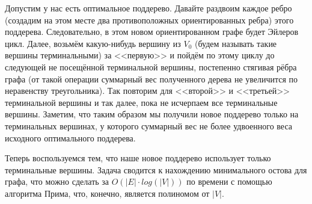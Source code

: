 \documentclass[a4paper,12pt]{article}
\begin{document}
    \vspace{1em}

    \noindent Допустим у нас есть оптимальное поддерево. Давайте раздвоим каждое ребро (создадим на этом месте два противоположных ориентированных ребра) этого поддерева. Следовательно, в этом новом ориентированном графе будет Эйлеров цикл. Далее, возьмём какую-нибудь вершину из $V_0$ (будем называть такие вершины терминальными) за <<первую>> и пойдём по этому циклу до следующей не посещённой терминальной вершины, постепенно стягивая рёбра графа (от такой операции суммарный вес полученного дерева не увеличится по неравенству треугольника). Так повторим для <<второй>> и <<третьей>> терминальной вершины и так далее, пока не исчерпаем все терминальные вершины. Заметим, что таким образом мы получили новое поддерево только на терминальных вершинах, у которого суммарный вес не более удвоенного веса исходного оптимального поддерева.

    \vspace{1em}

    \noindent Теперь воспользуемся тем, что наше новое поддерево использует только терминальные вершины. Задача сводится к нахождению минимального остова для графа, что можно сделать за $O\left(|E| \cdot log(|V|)\right)$ по времени с помощью алгоритма Прима, что, конечно, является полиномом от $|V|$.

    \vspace{1em}
\end{document}
